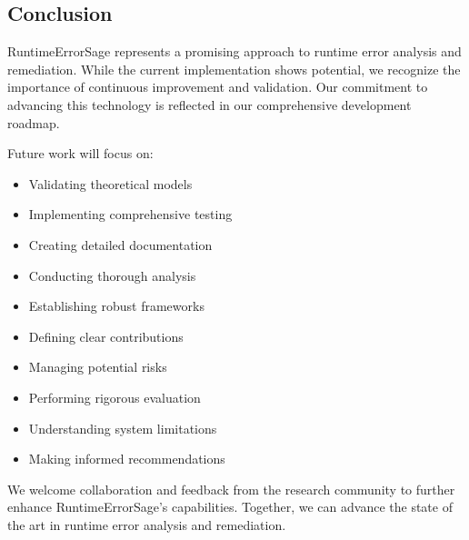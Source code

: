 \subsection{Conclusion}
RuntimeErrorSage represents a promising approach to runtime error analysis and remediation. While the current implementation shows potential, we recognize the importance of continuous improvement and validation. Our commitment to advancing this technology is reflected in our comprehensive development roadmap.

Future work will focus on:
\begin{itemize}
    \item Validating theoretical models
    \item Implementing comprehensive testing
    \item Creating detailed documentation
    \item Conducting thorough analysis
    \item Establishing robust frameworks
    \item Defining clear contributions
    \item Managing potential risks
    \item Performing rigorous evaluation
    \item Understanding system limitations
    \item Making informed recommendations
\end{itemize}

We welcome collaboration and feedback from the research community to further enhance RuntimeErrorSage's capabilities. Together, we can advance the state of the art in runtime error analysis and remediation.